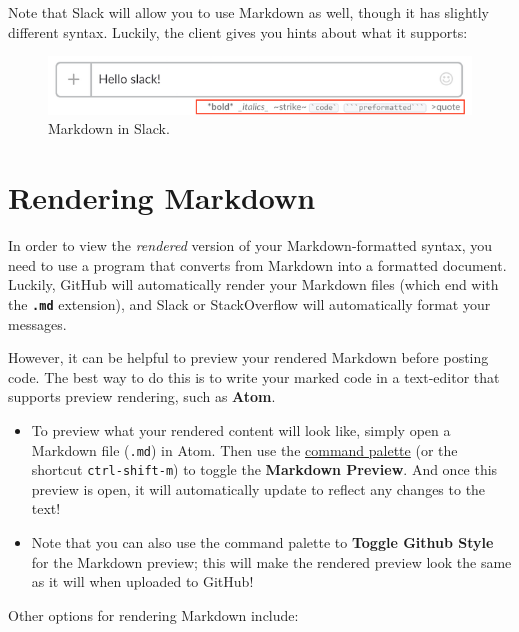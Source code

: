 \documentclass[]{book}
\theoremstyle{definition}
\theoremstyle{definition}
\theoremstyle{remark}
\begin{document}
Note that Slack will allow you to use Markdown as well, though it has
slightly different syntax. Luckily, the client gives you hints about
what it supports:

\begin{figure}
\centering
\includegraphics{img/markdown/markdown-slack.png}
\caption{Markdown in Slack.}
\end{figure}

\section{Rendering Markdown}\label{rendering-markdown}

In order to view the \emph{rendered} version of your Markdown-formatted
syntax, you need to use a program that converts from Markdown into a
formatted document. Luckily, GitHub will automatically render your
Markdown files (which end with the \textbf{\texttt{.md}} extension), and
Slack or StackOverflow will automatically format your messages.

However, it can be helpful to preview your rendered Markdown before
posting code. The best way to do this is to write your marked code in a
text-editor that supports preview rendering, such as \textbf{Atom}.

\begin{itemize}
\item
  To preview what your rendered content will look like, simply open a
  Markdown file (\texttt{.md}) in Atom. Then use the
  \href{http://flight-manual.atom.io/getting-started/sections/atom-basics/\#command-palette}{command
  palette} (or the shortcut \texttt{ctrl-shift-m}) to toggle the
  \textbf{Markdown Preview}. And once this preview is open, it will
  automatically update to reflect any changes to the text!
\item
  Note that you can also use the command palette to \textbf{Toggle
  Github Style} for the Markdown preview; this will make the rendered
  preview look the same as it will when uploaded to GitHub!
\end{itemize}

Other options for rendering Markdown include:
\end{document}
